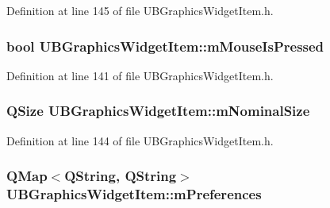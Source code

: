 Definition at line 145 of file U\-B\-Graphics\-Widget\-Item.\-h.

\hypertarget{class_u_b_graphics_widget_item_a353f7366b1ec5c5cd8887583ba9cb633}{
\subsubsection[{m\-Mouse\-Is\-Pressed}]{\setlength{\rightskip}{0pt plus 5cm}bool U\-B\-Graphics\-Widget\-Item\-::m\-Mouse\-Is\-Pressed\hspace{0.3cm}{\ttfamily [protected]}}}\label{d0/d16/class_u_b_graphics_widget_item_a353f7366b1ec5c5cd8887583ba9cb633}


Definition at line 141 of file U\-B\-Graphics\-Widget\-Item.\-h.

\hypertarget{class_u_b_graphics_widget_item_ae2c6c421328a101398332186bd3fcfb8}{
\subsubsection[{m\-Nominal\-Size}]{\setlength{\rightskip}{0pt plus 5cm}Q\-Size U\-B\-Graphics\-Widget\-Item\-::m\-Nominal\-Size\hspace{0.3cm}{\ttfamily [protected]}}}\label{d0/d16/class_u_b_graphics_widget_item_ae2c6c421328a101398332186bd3fcfb8}


Definition at line 144 of file U\-B\-Graphics\-Widget\-Item.\-h.

\hypertarget{class_u_b_graphics_widget_item_aef3b6f64a7f5c8e7c67b7e9645052658}{
\subsubsection[{m\-Preferences}]{\setlength{\rightskip}{0pt plus 5cm}Q\-Map$<$Q\-String, Q\-String$>$ U\-B\-Graphics\-Widget\-Item\-::m\-Preferences\hspace{0.3cm}{\ttfamily [protected]}}}\label{d0/d16/class_u_b_graphics_widget_item_aef3b6f64a7f5c8e7c67b7e9645052658}


